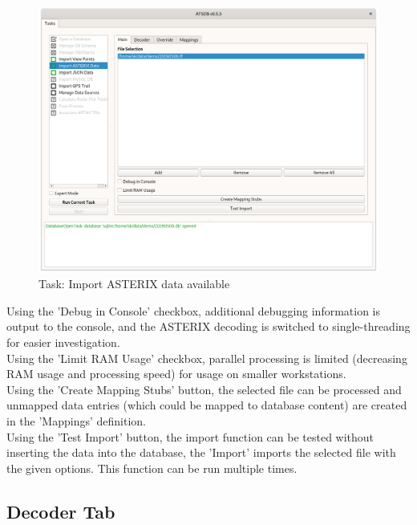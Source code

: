 \begin{figure}[H]
  \hspace*{-2.5cm}
    \includegraphics[width=19cm]{figures/asterix_import_data_ready.png}
  \caption{Task: Import ASTERIX data available}
\end{figure}

Using the 'Debug in Console' checkbox, additional debugging information is output to the console, and the ASTERIX decoding is switched to single-threading for easier investigation. \\

Using the 'Limit RAM Usage' checkbox, parallel processing is limited (decreasing RAM usage and processing speed) for usage on smaller workstations. \\

Using the 'Create Mapping Stubs' button, the selected file can be processed and unmapped data entries (which could be mapped to database content) are created in the 'Mappings' definition. \\

Using the 'Test Import' button, the import function can be tested without inserting the data into the 
database, the 'Import' imports the selected file with the given options. This function can be run multiple times. \\

\subsection{Decoder Tab}

